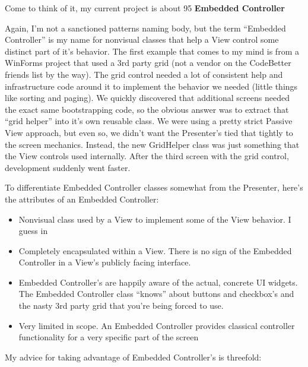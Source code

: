 \documentclass{article}
\begin{document}
{Come to think of it, my current project is about 95%
\Large {\textbf{Embedded Controller}}

Again, I'm not a sanctioned patterns naming body, but the term “Embedded Controller” is my name for nonvisual classes that help a View control some distinct part of it's behavior.  The first example that comes to my mind is from a WinForms project that used a 3rd party grid (not a vendor on the CodeBetter friends list by the way).  The grid control needed a lot of consistent help and infrastructure code around it to implement the behavior we needed (little things like sorting and paging).  We quickly discovered that additional screens needed the exact same bootstrapping code, so the obvious answer was to extract that “grid helper” into it's own reusable class.  We were using a pretty strict Passive View approach, but even so, we didn't want the Presenter's tied that tightly to the screen mechanics.  Instead, the new GridHelper class was just something that the View controls used internally.  After the third screen with the grid control, development suddenly went faster. 

To differentiate Embedded Controller classes somewhat from the Presenter, here's the attributes of an Embedded Controller:
 \begin{itemize}
 \item  Nonvisual class used by a View to implement some of the View behavior.  I guess in  
 \item  Completely encapsulated within a View.  There is no sign of the Embedded Controller in a View's publicly facing interface.  
 \item  Embedded Controller's are happily aware of the actual, concrete UI widgets.  The Embedded Controller class “knows” about buttons and checkbox's and the nasty 3rd party grid that you're being forced to use.  
 \item  Very limited in scope.  An Embedded Controller provides classical controller functionality for a very specific part of the screen  
 \end{itemize}
 

My advice for taking advantage of Embedded Controller's is threefold:

}
\end{document}
